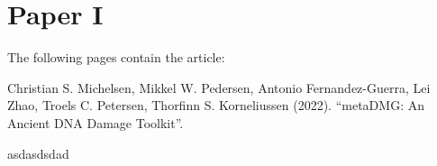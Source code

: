\chapter{Paper I}

The following pages contain the article:
\vspace*{1cm}


Christian S. Michelsen, Mikkel W. Pedersen, Antonio Fernandez-Guerra, Lei Zhao, Troels C. Petersen, Thorfinn S. Korneliussen (2022). ``metaDMG: An Ancient DNA Damage Toolkit''.

\clearpage

asdasdsdad

\clearpage
% 



